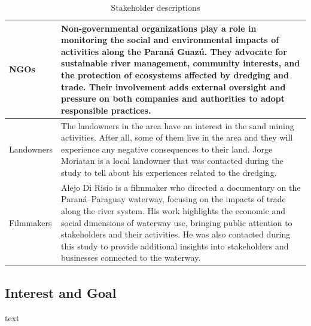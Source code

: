 \begin{table}[H]
\begin{tabularx}{\linewidth}{p{3.5cm}X}
\midrule
NGOs & Non-governmental organizations play a role in monitoring the social and environmental impacts of activities along the Paraná Guazú. They advocate for sustainable river management, community interests, and the protection of ecosystems affected by dredging and trade. Their involvement adds external oversight and pressure on both companies and authorities to adopt responsible practices. \\
\midrule
Landowners & The landowners in the area have an interest in the sand mining activities. After all, some of them live in the area and they will experience any negative consequences to their land. Jorge Moriatan is a local landowner that was contacted during the study to tell about his experiences related to the dredging. \\
\midrule
Filmmakers & Alejo Di Risio is a filmmaker who directed a documentary on the Paraná–Paraguay waterway, focusing on the impacts of trade along the river system. His work highlights the economic and social dimensions of waterway use, bringing public attention to stakeholders and their activities. He was also contacted during this study to provide additional insights into stakeholders and businesses connected to the waterway. \\
\bottomrule
\end{tabularx}
\caption{Stakeholder descriptions}
\label{tab:stakeholders-description}
\end{table}

\subsection{Interest and Goal}
text

